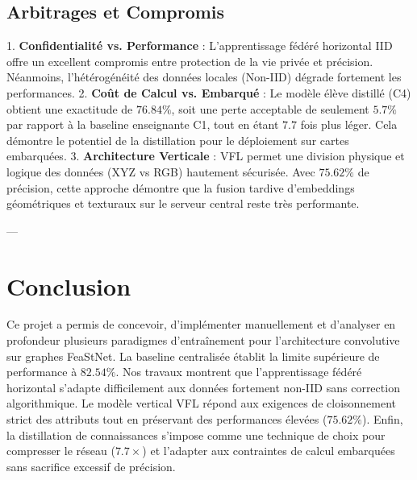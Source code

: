 \documentclass[11pt,a4paper]{article}
\begin{document}
\subsection{Arbitrages et Compromis}
1.  \textbf{Confidentialité vs. Performance} : L'apprentissage fédéré horizontal IID offre un excellent compromis entre protection de la vie privée et précision. Néanmoins, l'hétérogénéité des données locales (Non-IID) dégrade fortement les performances.
2.  \textbf{Coût de Calcul vs. Embarqué} : Le modèle élève distillé (C4) obtient une exactitude de $76.84\%$, soit une perte acceptable de seulement $5.7\%$ par rapport à la baseline enseignante C1, tout en étant $7.7$ fois plus léger. Cela démontre le potentiel de la distillation pour le déploiement sur cartes embarquées.
3.  \textbf{Architecture Verticale} : VFL permet une division physique et logique des données (XYZ vs RGB) hautement sécurisée. Avec $75.62\%$ de précision, cette approche démontre que la fusion tardive d'embeddings géométriques et texturaux sur le serveur central reste très performante.

---

\section{Conclusion}
Ce projet a permis de concevoir, d'implémenter manuellement et d'analyser en profondeur plusieurs paradigmes d'entraînement pour l'architecture convolutive sur graphes FeaStNet. La baseline centralisée établit la limite supérieure de performance à $82.54\%$. Nos travaux montrent que l'apprentissage fédéré horizontal s'adapte difficilement aux données fortement non-IID sans correction algorithmique. Le modèle vertical VFL répond aux exigences de cloisonnement strict des attributs tout en préservant des performances élevées ($75.62\%$). Enfin, la distillation de connaissances s'impose comme une technique de choix pour compresser le réseau ($7.7\times$) et l'adapter aux contraintes de calcul embarquées sans sacrifice excessif de précision.
\end{document}
